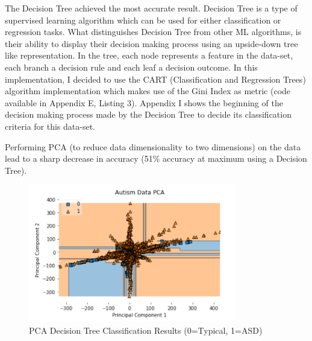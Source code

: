 
The Decision Tree achieved the most accurate result. Decision Tree is a type of supervised learning algorithm which can be used for either classification or regression tasks. What distinguishes Decision Tree from other ML algorithms, is their ability to display their decision making process using an upside-down tree like representation. In the tree, each node represents a feature in the data-set, each branch a decision rule and each leaf a decision outcome. In this implementation, I decided to use the CART (Classification and Regression Trees) algorithm implementation which makes use of the Gini Index as metric (code available in Appendix E, Listing 3). Appendix I shows the beginning of the decision making process made by the Decision Tree to decide its classification criteria for this data-set.




% 


Performing PCA (to reduce data dimensionality to two dimensions) on the data lead to a sharp decrease in accuracy (51\% accuracy at maximum using a Decision Tree).

\begin{figure}[ht!]%
    \centering
    \includegraphics[width=9cm]{images/mlpca.PNG}%
    \caption{PCA Decision Tree Classification Results (0=Typical, 1=ASD)}
\end{figure}

